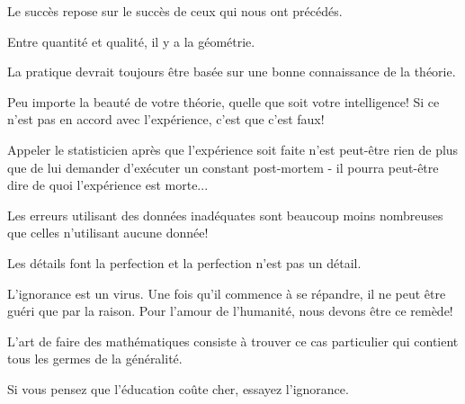 \documentclass[12pt,a4paper,twoside,openright]{report}
\theoremstyle{definition}
\theoremstyle{itexmp}
\numberwithin{equation}{section}
\begin{document}
	\begin{fquote}[?]Le succès repose sur le succès de ceux qui nous ont précédés.
 	\end{fquote}
 	
 	\begin{fquote}Entre quantité et qualité, il y a la géométrie.
 	\end{fquote}

	\begin{fquote}La pratique devrait toujours être basée sur une bonne connaissance de la théorie.
 	\end{fquote}
 	
 	\begin{fquote}Peu importe la beauté de votre théorie, quelle que soit votre intelligence! Si ce n'est pas en accord avec l'expérience, c'est que c'est faux!
 	\end{fquote}
 	
 	\begin{fquote}Appeler le statisticien après que l'expérience soit faite n'est peut-être rien de plus que de lui demander d'exécuter un constant post-mortem - il pourra peut-être dire de quoi l'expérience est morte...
 	\end{fquote}
 	
 	\begin{fquote}Les erreurs utilisant des données inadéquates sont beaucoup moins nombreuses que celles n'utilisant aucune donnée!
 	\end{fquote}
 	
 	\begin{fquote}Les détails font la perfection et la perfection n'est pas un détail.
 	\end{fquote}
 	
 	\begin{fquote}L'ignorance est un virus. Une fois qu'il commence à se répandre, il ne peut être guéri que par la raison. Pour l'amour de l'humanité, nous devons être ce remède!
 	\end{fquote}
 	
 	\begin{fquote}L'art de faire des mathématiques consiste à trouver ce cas particulier qui contient tous les germes de la généralité.
 	\end{fquote}

 	\begin{fquote}Si vous pensez que l'éducation coûte cher, essayez l'ignorance.
 	\end{fquote}
 	
\end{document}
